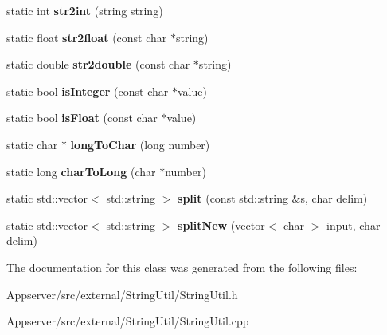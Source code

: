 \begin{DoxyCompactItemize}
\item 
static int {\bfseries str2int} (string string)\hypertarget{classStringUtil_ad1cf02239bb018a17175020283e8147b}{}\label{classStringUtil_ad1cf02239bb018a17175020283e8147b}

\item 
static float {\bfseries str2float} (const char $\ast$string)\hypertarget{classStringUtil_a1e5c05752beceabb828df9b5adc0fe0d}{}\label{classStringUtil_a1e5c05752beceabb828df9b5adc0fe0d}

\item 
static double {\bfseries str2double} (const char $\ast$string)\hypertarget{classStringUtil_abc31b7ed00dfe191faf3a527a171e278}{}\label{classStringUtil_abc31b7ed00dfe191faf3a527a171e278}

\item 
static bool {\bfseries is\+Integer} (const char $\ast$value)\hypertarget{classStringUtil_aee8bcf751cbc2d78b7d3f2544b1f43f1}{}\label{classStringUtil_aee8bcf751cbc2d78b7d3f2544b1f43f1}

\item 
static bool {\bfseries is\+Float} (const char $\ast$value)\hypertarget{classStringUtil_a9882b479747ebefcb711033dea44a3b7}{}\label{classStringUtil_a9882b479747ebefcb711033dea44a3b7}

\item 
static char $\ast$ {\bfseries long\+To\+Char} (long number)\hypertarget{classStringUtil_ac9fcfb6cc45536594dd8dd77037a726a}{}\label{classStringUtil_ac9fcfb6cc45536594dd8dd77037a726a}

\item 
static long {\bfseries char\+To\+Long} (char $\ast$number)\hypertarget{classStringUtil_a2037953e9c1c6b2acd916f205e2d3fa0}{}\label{classStringUtil_a2037953e9c1c6b2acd916f205e2d3fa0}

\item 
static std\+::vector$<$ std\+::string $>$ {\bfseries split} (const std\+::string \&s, char delim)\hypertarget{classStringUtil_aecb6061afe6a696ea00e84e500ee559f}{}\label{classStringUtil_aecb6061afe6a696ea00e84e500ee559f}

\item 
static std\+::vector$<$ std\+::string $>$ {\bfseries split\+New} (vector$<$ char $>$ input, char delim)\hypertarget{classStringUtil_a80167ad76774a3dbea54af28da896faa}{}\label{classStringUtil_a80167ad76774a3dbea54af28da896faa}

\end{DoxyCompactItemize}


The documentation for this class was generated from the following files\+:\begin{DoxyCompactItemize}
\item 
Appserver/src/external/\+String\+Util/String\+Util.\+h\item 
Appserver/src/external/\+String\+Util/String\+Util.\+cpp\end{DoxyCompactItemize}
